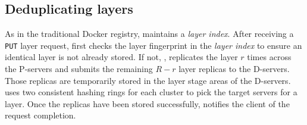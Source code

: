 \subsection{Deduplicating layers}
\label{sec:dedup-desgin}

%
%
As in the traditional Docker registry, \sysname maintains a \emph{layer index}.
After receiving a \texttt{PUT} layer request,
\sysname first checks the layer fingerprint in the \emph{layer index} to ensure 
an identical layer is not already stored.
If not, \sysname,
replicates the layer $r$ times across the P-servers
and submits the remaining $R-r$ layer replicas to the D-servers. Those replicas are
temporarily stored in the layer stage areas of the D-servers. \sysname uses
two consistent hashing rings for each cluster to pick the target servers for
a layer. Once the replicas
have been stored successfully, \sysname notifies the client of the request completion.
%

%
%
%
%

